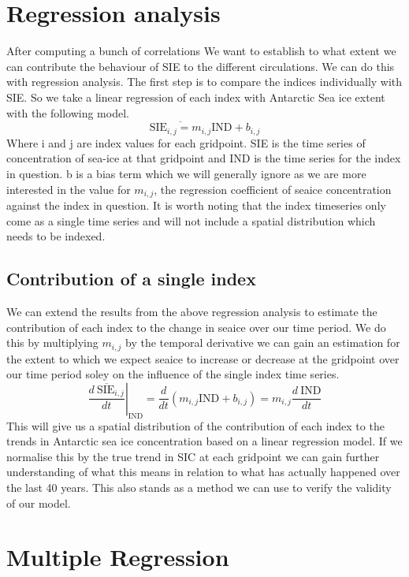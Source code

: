 \documentclass[../main.tex]{subfiles}
\begin{document}
\section{Regression analysis}
After computing a bunch of correlations We want to establish to what extent we can contribute the behaviour of SIE to the different circulations. We can do this with regression analysis. The first step is to compare the indices individually with SIE. So we take a linear regression of each index with Antarctic Sea ice extent with the following model.
$$
\overline{\text{SIE}_{i,j} = m_{i,j}}  \text{IND} + b_{i,j}
$$
Where i and j are index values for each gridpoint. SIE is the time series of concentration of sea-ice at that gridpoint and IND is the time series for the index in question. b is a bias term which we will generally ignore as we are more interested in the value for $m_{i,j}$, the regression coefficient of seaice concentration against the index in question. It is worth noting that the index timeseries only come as a single time series and will not include a spatial distribution which needs to be indexed.

\subsection{Contribution of a single index}
We can extend the results from the above regression analysis to estimate the contribution of each index to the change in seaice over our time period. We do this by multiplying $m_{i,j}$ by the temporal derivative we can gain an estimation for the extent to which we expect seaice to increase or decrease at the gridpoint over our time period soley on the influence of the single index time series.
$$
\left. \overline{\frac{d\  \text{SIE}_{i,j}}{dt}}\right|_{\text{IND}} = \frac{d}{dt} \left(m_{i,j}  \text{IND} + b_{i,j}\right) = m_{i,j}  \frac{d\ \text{IND}}{dt}
$$
This will give us a spatial distribution of the contribution of each index to the trends in Antarctic sea ice concentration based on a linear regression model. If we normalise this by the true trend in SIC at each gridpoint we can gain further understanding of what this means in relation to what has actually happened over the last 40 years. This also stands as a method we can use to verify the validity of our model.

\section{Multiple Regression}
\end{document}
